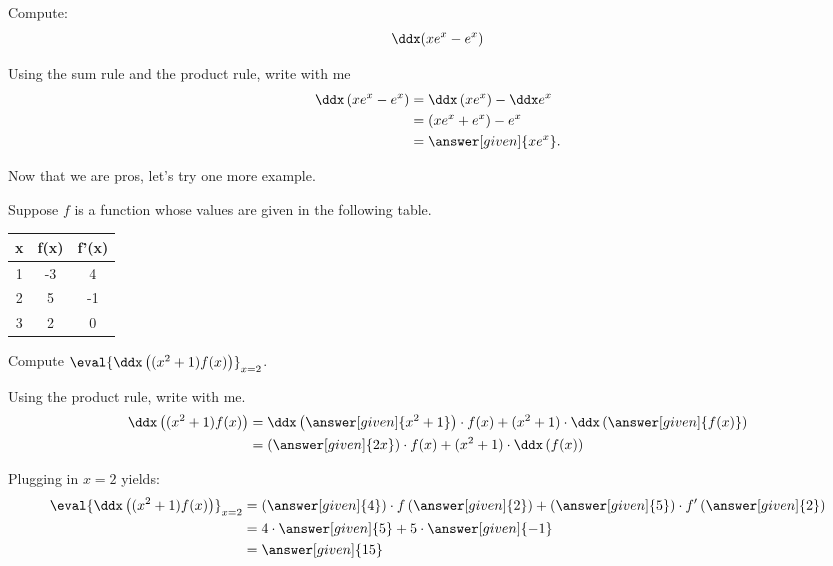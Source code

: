 \documentclass{ximera}
\begin{document}
\begin{example} 
	Compute: 
	\[\ddx(xe^x-e^x) \]
	\begin{explanation}
		Using the sum rule and the product rule, write with me
		\begin{align*}
			\ddx \left(xe^x-e^x \right) &=\ddx \left(xe^x\right)-\ddx e^x\\
				&=(xe^x+e^x)-e^x\\
				&=\answer[given]{x e^x}.
		\end{align*}
	\end{explanation}
\end{example}

Now that we are pros, let's try one more example.

\begin{example}
	Suppose $f$ is a function whose values are given in the following table.
	\begin{center}
		\begin{tabular}{c c c}
			\hline \hline
			x & f(x) & f'(x) \\ 
			\hline
			1 & -3 & 4\\
			2 & 5 & -1\\
			3 & 2 & 0\\
			\hline
		\end{tabular}		
	\end{center}
		
	Compute $\eval{ \ddx\left( (x^2+1) f(x) \right)}_{x=2}$.
	\begin{explanation}
	Using the product rule, write with me.
	\begin{align*}
		\ddx\left( (x^2+1) f(x) \right) &= \ddx \left( \answer[given]{x^2+1} \right) \cdot f(x) + (x^2+1) \cdot \ddx\left( \answer[given]{f(x)} \right) \\
			&= \left( \answer[given]{2x} \right) \cdot f(x) + (x^2+1) \cdot \ddx \left( f(x) \right)
	\end{align*}
	
	Plugging in $x=2$ yields:
	\begin{align*}
		\eval{ \ddx\left( (x^2+1) f(x) \right) }_{x=2} &= \left( \answer[given]{4} \right) \cdot f\left( \answer[given]{2} \right) + \left( \answer[given]{5} \right) \cdot f'\left( \answer[given]{2} \right)\\	
			&= 4 \cdot \answer[given]{5} + 5 \cdot \answer[given]{-1}\\
			&= \answer[given]{15}
	\end{align*}
	\end{explanation}
\end{example}
\end{document}
